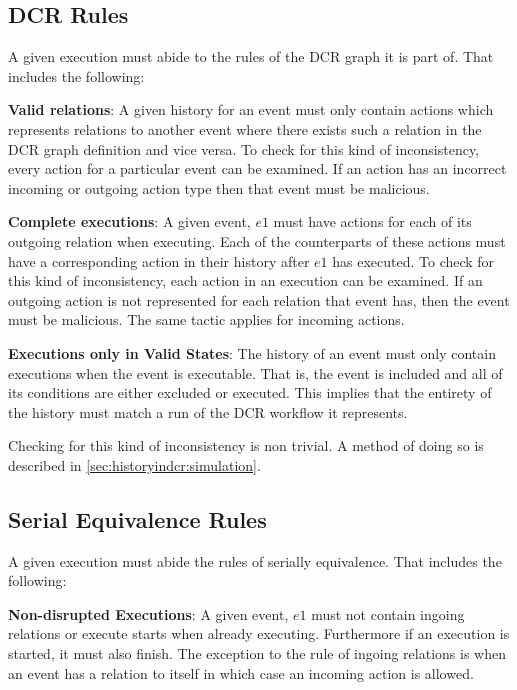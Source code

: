 	\subsection{DCR Rules}
	A given execution must abide to the rules of the DCR graph it is part of. That includes the following:
	
	\newpar \textbf{Valid relations}: A given history for an event must only contain actions which represents relations to another event where there exists such a relation in the DCR graph definition and vice versa. 
	To check for this kind of inconsistency, every action for a particular event can be examined. If an action has an incorrect incoming or outgoing action type then that event must be malicious. 
	
	\newpar \textbf{Complete executions}: A given event, $e1$ must have actions for each of its outgoing relation when executing. Each of the counterparts of these actions must have a corresponding action in their history after $e1$ has executed.
	To check for this kind of inconsistency, each action in an execution can be examined. If an outgoing action is not represented for each relation that event has, then the event must be malicious. The same tactic applies for incoming actions.
	
	\newpar \textbf{Executions only in Valid States}: The history of an event must only contain executions when the event is executable. That is, the event is included and all of its conditions are either excluded or executed. This implies that the entirety of the history must match a run of the DCR workflow it represents.
	
	Checking for this kind of inconsistency is non trivial. A method of doing so is described in \autoref{sec:historyindcr:simulation}.
	
	\subsection{Serial Equivalence Rules}
	A given execution must abide the rules of serially equivalence. That includes the following:
	
	\newpar \textbf{Non-disrupted Executions}: A given event, $e1$ must not contain ingoing relations or execute starts when already executing. Furthermore if an execution is started, it must also finish. The exception to the rule of ingoing relations is when an event has a relation to itself in which case an incoming action is allowed.
	
